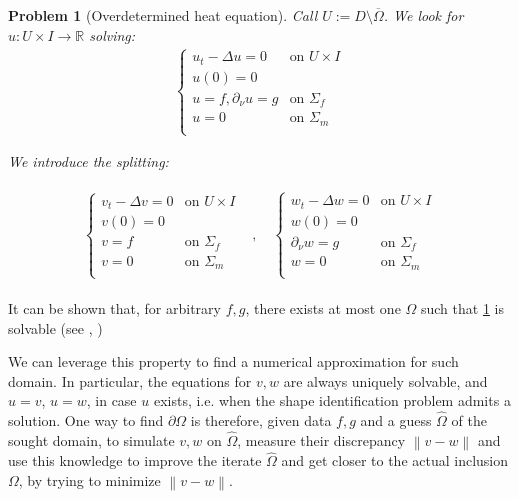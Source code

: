 \documentclass[english,a4paper,10pt,oneside]{scrbook}	%
\theoremstyle{break}
\newtheorem{pb}[equation]{Problem}
\theoremstyle{remark}
\newcommand{\mR}{\mathbb{R}}
\newcommand{\norm}[1]{\left\lVert#1\right\rVert}
\begin{document}
\begin{pb}[Overdetermined heat equation]
\label{pb:pdes}
Call $U:=D\setminus \overline{\Omega}$. We look for $u:U \times I \rightarrow \mR$ solving:
\begin{align*}
\left\{\begin{matrix}
u_t -\Delta u=0 & \text{on }U\times I \\ 
u(0)=0 & \\ 
u = f, \partial_\nu u=g & \text{on }\Sigma_f\\
u = 0 & \text{on }\Sigma_m\\
\end{matrix}\right.
\end{align*}

We introduce the splitting:

\begin{align*}
\begin{matrix}
\left\{\begin{matrix}
v_t -\Delta v=0 & \text{on }U\times I \\ 
v(0)=0 & \\ 
v = f& \text{on }\Sigma_f\\
v = 0 & \text{on }\Sigma_m\\
\end{matrix}\right. &, \quad  \left\{\begin{matrix}
w_t -\Delta w=0 & \text{on }U\times I \\ 
w(0)=0 & \\ 
\partial_\nu w=g & \text{on }\Sigma_f\\
w = 0 & \text{on }\Sigma_m\\
\end{matrix}\right.
\end{matrix}
\end{align*}
\end{pb}

It can be shown that, for arbitrary $f,g$, there exists at most one $\Omega$ such that \cref{pb:pdes} is solvable (see \cite{chapko1}, \cite{chapko2})


We can leverage this property to find a numerical approximation for such domain.
In particular, the equations for $v,w$ are always uniquely solvable, and $u=v$, $u=w$, in case $u$ exists, i.e. when the shape identification problem admits a solution. One way to find $\partial \Omega$ is therefore, given data $f,g$ and a guess $\hat{\Omega}$ of the sought domain, to simulate $v,w$ on $\hat{\Omega}$, measure their discrepancy $\norm{v-w}$ and use this knowledge to improve the iterate $\hat{\Omega}$ and get closer to the actual inclusion $\Omega$, by trying to minimize $\norm{v-w}$.
\end{document}
